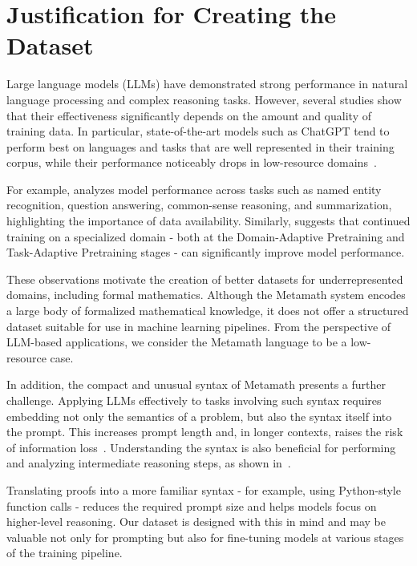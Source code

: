 \section{Justification for Creating the Dataset}
\hspace{\parindent}
Large language models (LLMs) have demonstrated strong performance in natural language processing and complex
reasoning tasks. However, several studies show that their effectiveness significantly depends on the amount and
quality of training data. In particular, state-of-the-art models such as ChatGPT tend to perform best on languages
and tasks that are well represented in their training corpus, while their performance noticeably drops in
low-resource domains~\cite{chatgpt_mt, low_resource_biomedicine}.

For example, \cite{chatgpt_multilingual} analyzes model performance across tasks such as named entity recognition,
question answering, common-sense reasoning, and summarization, highlighting the importance of data availability.
Similarly, \cite{dont_stop_pretraining} suggests that continued training on a specialized domain - both at the Domain-Adaptive Pretraining and Task-Adaptive Pretraining stages - can significantly improve model performance.

These observations motivate the creation of better datasets for underrepresented domains, including formal mathematics. Although the Metamath system encodes a large body of formalized mathematical knowledge, it does not offer a structured dataset suitable for use in machine learning pipelines. From the perspective of LLM-based applications, we consider the Metamath language to be a low-resource case.

In addition, the compact and unusual syntax of Metamath presents a further challenge. Applying LLMs effectively to tasks involving such syntax requires embedding not only the semantics of a problem, but also the syntax itself into the prompt. This increases prompt length and, in longer contexts, raises the risk of information loss~\cite{lost_in_middle, babilong, whatsrealcontext}. Understanding the syntax is also beneficial for performing and analyzing intermediate reasoning steps, as shown in~\cite{show_your_work}.

Translating proofs into a more familiar syntax - for example, using Python-style function calls - reduces the
required prompt size and helps models focus on higher-level reasoning. Our dataset is designed with this in mind and may be valuable not only for prompting but also for fine-tuning models at various stages of the training pipeline.


